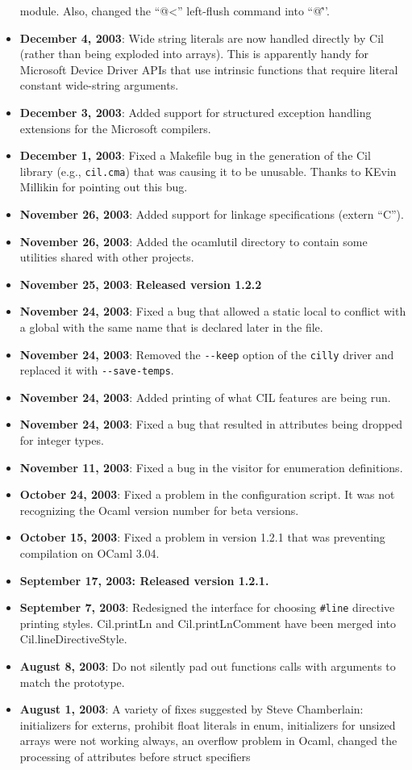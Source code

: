 \documentclass[letterpaper]{article}
\def\t#1{{\tt #1}}
\begin{document}
\begin{itemize}
module. Also, changed the ``@<'' left-flush command into ``@\^''.
\item {\bf December 4, 2003}: Wide string literals are now handled
directly by Cil (rather than being exploded into arrays). This is
apparently handy for Microsoft Device Driver APIs that use intrinsic
functions that require literal constant wide-string arguments. 
\item {\bf December 3, 2003}: Added support for structured exception handling
  extensions for the Microsoft compilers.
\item {\bf December 1, 2003}: Fixed a Makefile bug in the generation of the 
Cil library (e.g., \t{cil.cma}) that was causing it to be unusable. Thanks
to KEvin Millikin for pointing out this bug. 
\item {\bf November 26, 2003}: Added support for linkage specifications
       (extern ``C''). 
\item {\bf November 26, 2003}: Added the ocamlutil directory to contain some
utilities shared with other projects. 
\item {\bf November 25, 2003}: {\bf Released version 1.2.2}
\item {\bf November 24, 2003}: Fixed a bug that allowed a static local to
  conflict with a global with the same name that is declared later in the
  file. 
\item {\bf November 24, 2003}: Removed the \t{-{}-keep} option of the \t{cilly}
  driver and replaced it with \t{-{}-save-temps}.
\item {\bf November 24, 2003}: Added printing of what CIL features are being
  run.
\item {\bf November 24, 2003}: Fixed a bug that resulted in attributes being
  dropped for integer types. 
\item {\bf November 11, 2003}: Fixed a bug in the visitor for enumeration
  definitions. 
\item {\bf October 24, 2003}: Fixed a problem in the configuration script. It
  was not recognizing the Ocaml version number for beta versions. 
\item {\bf October 15, 2003}: Fixed a problem in version 1.2.1 that was
  preventing compilation on OCaml 3.04.
\item {\bf September 17, 2003: Released version 1.2.1.}
\item {\bf September 7, 2003}: Redesigned the interface for choosing
  \texttt{\#line} directive printing styles.  Cil.printLn and
  Cil.printLnComment have been merged into Cil.lineDirectiveStyle.
\item {\bf August 8, 2003}: Do not silently pad out functions calls with
arguments to match the prototype. 
\item {\bf August 1, 2003}: A variety of fixes suggested by Steve Chamberlain:
initializers for externs, prohibit float literals in enum, initializers for
unsized arrays were not working always, an overflow problem in Ocaml, changed
the processing of attributes before struct specifiers


\end{itemize}
\end{document}
